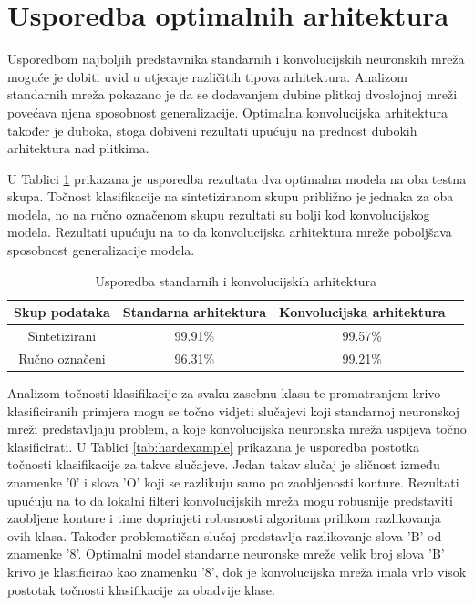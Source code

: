 \documentclass[lmodern, utf8, diplomski, numeric]{fer}
\begin{document}
\section{Usporedba optimalnih arhitektura}

Usporedbom najboljih predstavnika standarnih i konvolucijskih neuronskih mreža moguće je dobiti uvid u utjecaje različitih tipova arhitektura. Analizom standarnih mreža pokazano je da se dodavanjem dubine plitkoj dvoslojnoj mreži povećava njena sposobnost generalizacije. Optimalna konvolucijska arhitektura također je duboka, stoga dobiveni rezultati upućuju na prednost dubokih arhitektura nad plitkima. 

U Tablici \ref{tab:standconv} prikazana je usporedba rezultata dva optimalna modela na oba testna skupa. Točnost klasifikacije na sintetiziranom skupu približno je jednaka za oba modela, no na ručno označenom skupu rezultati su bolji kod konvolucijskog modela. Rezultati upućuju na to da konvolucijska arhitektura mreže poboljšava sposobnost generalizacije modela.  

\hspace{2em}
\begin{table}[ht!]
\begin{center}
\centering
    \begin{tabular}{ | c| c| c|c |}
    \hline    		
    Skup podataka & Standarna arhitektura & Konvolucijska arhitektura \\ \hline
    Sintetizirani & 99.91\% & 99.57\%  \\ \hline
    Ručno označeni & 96.31\% & 	99.21\%  \\
    \hline
    \end{tabular}
\end{center}
\caption{Usporedba standarnih i konvolucijskih arhitektura}
\label{tab:standconv}
\end{table}

Analizom točnosti klasifikacije za svaku zasebnu klasu te promatranjem krivo klasificiranih primjera mogu se točno vidjeti slučajevi koji standarnoj neuronskoj mreži predstavljaju problem, a koje konvolucijska neuronska mreža uspijeva točno klasificirati. U Tablici  \ref{tab:hardexample} prikazana je usporedba postotka točnosti klasifikacije za takve slučajeve. Jedan takav slučaj je sličnost između znamenke '0' i slova 'O' koji se razlikuju samo po zaobljenosti konture. Rezultati upućuju na to da lokalni filteri konvolucijskih mreža mogu robusnije predstaviti zaobljene konture i time doprinjeti robusnosti algoritma prilikom razlikovanja ovih klasa. Također problematičan slučaj predstavlja razlikovanje slova 'B' od znamenke '8'. Optimalni model standarne neuronske mreže velik broj slova 'B' krivo je klasificirao kao znamenku '8', dok je konvolucijska mreža imala vrlo visok postotak točnosti klasifikacije za obadvije klase.
\end{document}
